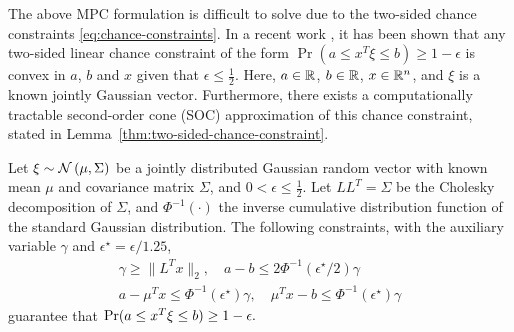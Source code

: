 The above MPC formulation is difficult to solve due to the two-sided chance constraints \eqref{eq:chance-constraints}. 
In a recent work \cite{lubinetal16two}, it has been shown that any two-sided linear chance constraint of the form
\(\Pr( a \leq x^T \xi \leq b ) \geq 1 - \epsilon\)
is convex in \(a\), \(b\) and \(x\) given that \(\epsilon \leq \frac{1}{2}\).
Here, \(a \in \mathbb{R}\), \(b \in \mathbb{R}\), \(x \in \mathbb{R}^n\),  and \(\xi\) is a known jointly Gaussian vector.
Furthermore, there exists a computationally tractable second-order cone (SOC) approximation of this chance constraint, stated in Lemma~\ref{thm:two-sided-chance-constraint}. 
\begin{lemma}
\label{thm:two-sided-chance-constraint}
Let $\xi \sim \operatorname*{\mathcal{N}}\left(\mu, \Sigma\right)$ be a jointly distributed Gaussian random vector with known mean $\mu$ and %
covariance matrix $\Sigma$, and $0 < \epsilon \leq \frac{1}{2}$.  Let $LL^T = \Sigma$ be the Cholesky decomposition of $\Sigma$, and $\Phi^{-1}(\cdot)$ the inverse cumulative distribution function %
of the standard Gaussian distribution.  The following constraints, with the auxiliary variable $\gamma$ and $\epsilon^\star = \epsilon / 1.25$,
\begin{gather*}
\gamma \geq \| L^T x \|_2, \quad a - b \leq 2 \Phi^{-1}(\epsilon^\star / 2) \gamma \\
a - \mu^T x \leq \Phi^{-1}(\epsilon^\star) \gamma, \quad \mu^T x - b \leq \Phi^{-1}(\epsilon^\star) \gamma 
\end{gather*}
guarantee that
\begin{math}
\Pr( a \leq x^T \xi \leq b ) \geq 1 - \epsilon \text.
\end{math}
\end{lemma}

